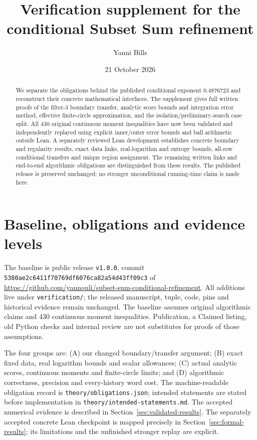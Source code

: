 \documentclass[11pt]{article}
\title{Verification supplement for the conditional Subset Sum refinement}
\author{Yanni Bills}
\date{21 October 2026}
\begin{document}
\maketitle
\begin{abstract}
We separate the obligations behind the published conditional exponent
$0.4876723$ and reconstruct their concrete mathematical interfaces.
The supplement gives full written proofs of the filter-3 boundary
transfer, analytic score bounds and integration error method, effective
finite-circle approximation, and the isolation/preliminary-search
case split. All 430 original continuous moment inequalities have now
been validated and independently replayed using explicit inner/outer
error bounds and ball arithmetic outside Lean. A separately reviewed
Lean development establishes concrete boundary and regularity results,
exact data links, real-logarithm and entropy bounds, all-row conditional
transfers and unique region assignment. The remaining written links and
end-to-end algorithmic obligations are distinguished from these results. The published release is preserved unchanged;
no stronger unconditional running-time claim is made here.
\end{abstract}

\section{Baseline, obligations and evidence levels}
The baseline is public release \texttt{v1.0.0}, commit
\texttt{5380ae2c6411f70769df6076ca82a54d43ff09c3} of
\url{https://github.com/yannouli/subset-sum-conditional-refinement}.
All additions live under \texttt{verification/}; the released manuscript,
tuple, code, pins and historical evidence remain unchanged.
The baseline assumes original algorithmic claims and 430 continuous
moment inequalities. Publication, a Claimed listing, old Python checks
and internal review are not substitutes for proofs of those assumptions.

The four groups are: (A) our changed boundary/transfer argument;
(B) exact fixed data, real logarithm bounds and scalar allowances;
(C) actual analytic scores, continuous moments and finite-circle limits;
and (D) algorithmic correctness, precision and every-history word cost.
The machine-readable obligation record is
\texttt{theory/obligations.json}; intended statements are stated before
implementation in \texttt{theory/intended-statements.md}.
The accepted numerical evidence is described in
Section~\ref{sec:validated-results}. The separately accepted concrete
Lean checkpoint is mapped precisely in Section~\ref{sec:formal-results};
its limitations and the unfinished stronger replay are explicit.
\end{document}
